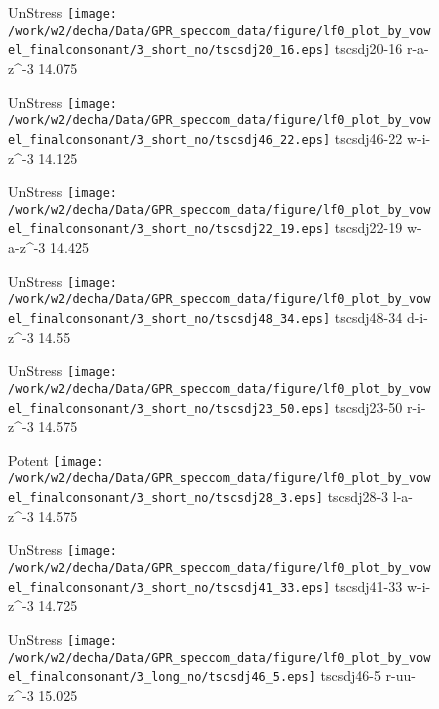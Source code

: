 \documentclass{article}
\begin{document}
\begin{figure}[t]
\begin{minipage}[b]{.24\textwidth}
UnStress
\centering
\texttt{[image: /work/w2/decha/Data/GPR\_speccom\_data/figure/lf0\_plot\_by\_vowel\_finalconsonant/3\_short\_no/tscsdj20\_16.eps]}
tscsdj20-16 r-a-z\textasciicircum-3 14.075
\end{minipage}
\begin{minipage}[b]{.24\textwidth}
UnStress
\centering
\texttt{[image: /work/w2/decha/Data/GPR\_speccom\_data/figure/lf0\_plot\_by\_vowel\_finalconsonant/3\_short\_no/tscsdj46\_22.eps]}
tscsdj46-22 w-i-z\textasciicircum-3 14.125
\end{minipage}
\begin{minipage}[b]{.24\textwidth}
UnStress
\centering
\texttt{[image: /work/w2/decha/Data/GPR\_speccom\_data/figure/lf0\_plot\_by\_vowel\_finalconsonant/3\_short\_no/tscsdj22\_19.eps]}
tscsdj22-19 w-a-z\textasciicircum-3 14.425
\end{minipage}
\begin{minipage}[b]{.24\textwidth}
UnStress
\centering
\texttt{[image: /work/w2/decha/Data/GPR\_speccom\_data/figure/lf0\_plot\_by\_vowel\_finalconsonant/3\_short\_no/tscsdj48\_34.eps]}
tscsdj48-34 d-i-z\textasciicircum-3 14.55
\end{minipage}
\end{figure}
\clearpage
\begin{figure}[t]
\begin{minipage}[b]{.24\textwidth}
UnStress
\centering
\texttt{[image: /work/w2/decha/Data/GPR\_speccom\_data/figure/lf0\_plot\_by\_vowel\_finalconsonant/3\_short\_no/tscsdj23\_50.eps]}
tscsdj23-50 r-i-z\textasciicircum-3 14.575
\end{minipage}
\begin{minipage}[b]{.24\textwidth}
\colorbox{Apricot}{Potent}
\centering
\texttt{[image: /work/w2/decha/Data/GPR\_speccom\_data/figure/lf0\_plot\_by\_vowel\_finalconsonant/3\_short\_no/tscsdj28\_3.eps]}
tscsdj28-3 l-a-z\textasciicircum-3 14.575
\end{minipage}
\begin{minipage}[b]{.24\textwidth}
UnStress
\centering
\texttt{[image: /work/w2/decha/Data/GPR\_speccom\_data/figure/lf0\_plot\_by\_vowel\_finalconsonant/3\_short\_no/tscsdj41\_33.eps]}
tscsdj41-33 w-i-z\textasciicircum-3 14.725
\end{minipage}
\begin{minipage}[b]{.24\textwidth}
UnStress
\centering
\texttt{[image: /work/w2/decha/Data/GPR\_speccom\_data/figure/lf0\_plot\_by\_vowel\_finalconsonant/3\_long\_no/tscsdj46\_5.eps]}
tscsdj46-5 r-uu-z\textasciicircum-3 15.025
\end{minipage}
\end{figure}
\end{document}
